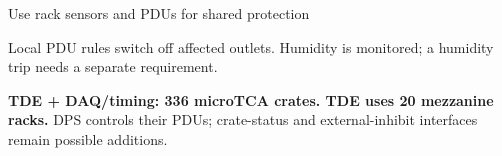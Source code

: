 \begin{frame}{Use rack sensors and PDUs for shared protection}
\centering
{}\par\smallskip
\raggedright{}\par\smallskip
\raggedright

Local PDU rules switch off affected outlets. Humidity is monitored; a humidity trip needs a separate requirement.\par\medskip
\textbf{TDE + DAQ/timing: 336 microTCA crates. TDE uses 20 mezzanine racks.} DPS controls their PDUs; crate-status and external-inhibit interfaces remain possible additions.
\end{frame}

